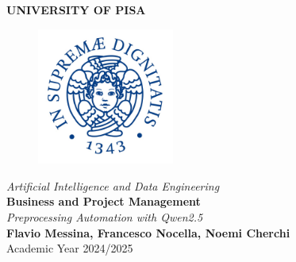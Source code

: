 \begin{titlepage}
    \centering
    \vspace*{\fill}
    {\LARGE \textbf{UNIVERSITY OF PISA}}\\[0.5cm]
    \begin{figure}[h]
        \centering
        \includegraphics[width=0.4\textwidth]{media/university-of-Pisa-logo.jpg}
    \end{figure}
    {\Large \textit{Artificial Intelligence and Data Engineering}}\\[1.5cm]
    {\LARGE \textbf{Business and Project Management}}\\[1cm]
    {\Large \textit{Preprocessing Automation with Qwen2.5}}\\[2cm]
    
    {\large \textbf{Flavio Messina, Francesco Nocella, Noemi Cherchi}}\\[0.5cm]
    {\large Academic Year 2024/2025}
    \vspace*{\fill}
\end{titlepage}
